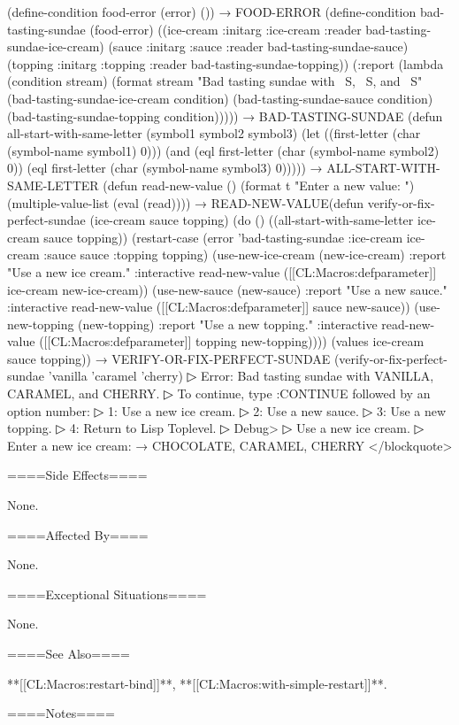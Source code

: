 (define-condition food-error (error) ()) → FOOD-ERROR (define-condition bad-tasting-sundae (food-error) ((ice-cream :initarg :ice-cream :reader bad-tasting-sundae-ice-cream) (sauce :initarg :sauce :reader bad-tasting-sundae-sauce) (topping :initarg :topping :reader bad-tasting-sundae-topping)) (:report (lambda (condition stream) (format stream "Bad tasting sundae with ~S, ~S, and ~S" (bad-tasting-sundae-ice-cream condition) (bad-tasting-sundae-sauce condition) (bad-tasting-sundae-topping condition))))) → BAD-TASTING-SUNDAE (defun all-start-with-same-letter (symbol1 symbol2 symbol3) (let ((first-letter (char (symbol-name symbol1) 0))) (and (eql first-letter (char (symbol-name symbol2) 0)) (eql first-letter (char (symbol-name symbol3) 0))))) → ALL-START-WITH-SAME-LETTER (defun read-new-value () (format t "Enter a new value: ") (multiple-value-list (eval (read)))) → READ-NEW-VALUE\eject (defun verify-or-fix-perfect-sundae (ice-cream sauce topping) (do () ((all-start-with-same-letter ice-cream sauce topping)) (restart-case (error 'bad-tasting-sundae :ice-cream ice-cream :sauce sauce :topping topping) (use-new-ice-cream (new-ice-cream) :report "Use a new ice cream." :interactive read-new-value ([[CL:Macros:defparameter]] ice-cream new-ice-cream)) (use-new-sauce (new-sauce) :report "Use a new sauce." :interactive read-new-value ([[CL:Macros:defparameter]] sauce new-sauce)) (use-new-topping (new-topping) :report "Use a new topping." :interactive read-new-value ([[CL:Macros:defparameter]] topping new-topping)))) (values ice-cream sauce topping)) → VERIFY-OR-FIX-PERFECT-SUNDAE (verify-or-fix-perfect-sundae 'vanilla 'caramel 'cherry)
▷ Error: Bad tasting sundae with VANILLA, CARAMEL, and CHERRY.
▷ To continue, type :CONTINUE followed by an option number:
▷ 1: Use a new ice cream.
▷ 2: Use a new sauce.
▷ 3: Use a new topping.
▷ 4: Return to Lisp Toplevel.
▷ Debug> 
▷ Use a new ice cream.
▷ Enter a new ice cream:  → CHOCOLATE, CARAMEL, CHERRY </blockquote>

====Side Effects====

None.

====Affected By====

None.

====Exceptional Situations====

None.

====See Also====

**[[CL:Macros:restart-bind]]**, **[[CL:Macros:with-simple-restart]]**.

====Notes====

